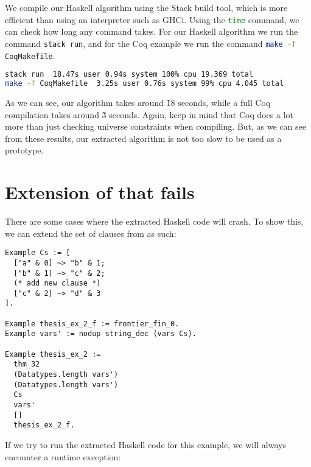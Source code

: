 We compile our Haskell algorithm using the Stack build tool,
which is more efficient than using an interpreter such as GHCi.
Using the \lstinline[language=bash]{time} command, we can check how long
any command takes. For our Haskell algorithm we run the command \lstinline[language=bash]{stack run},
and for the Coq example we run the command \lstinline[language=bash]{make -f CoqMakefile}.

\begin{minipage}{\linewidth}
\begin{lstlisting}[language=bash, label={lst:real_world_example_bench}, caption={Real-world example benchmark}]
stack run  18.47s user 0.94s system 100% cpu 19.369 total
make -f CoqMakefile  3.25s user 0.76s system 99% cpu 4.045 total
\end{lstlisting}
\end{minipage}

As we can see, our algorithm takes around \~18 seconds, while a full Coq compilation
takes around \~3 seconds.
Again, keep in mind that Coq does a lot more than just checking universe constraints when
compiling. But, as we can see from these results, our extracted algorithm
is not too slow to be used as a prototype.

\section{Extension of  that fails}
\label{sec:limitations}

There are some cases where the extracted Haskell code will crash.
To show this, we can extend the set of clauses from  as such:

\begin{minipage}{\linewidth}
\begin{lstlisting}[language=Coq, label={lst:thm_32_coq_example_extended}, caption={\lstinline{thm_32} example extended}]
Example Cs := [
  ["a" & 0] ~> "b" & 1;
  ["b" & 1] ~> "c" & 2;
  (* add new clause *)
  ["c" & 2] ~> "d" & 3
].

Example thesis_ex_2_f := frontier_fin_0.
Example vars' := nodup string_dec (vars Cs).

Example thesis_ex_2 :=
  thm_32
  (Datatypes.length vars')
  (Datatypes.length vars')
  Cs
  vars'
  []
  thesis_ex_2_f.
\end{lstlisting}
\end{minipage}

If we try to run the extracted Haskell code for this example,
we will always encounter a runtime exception:

